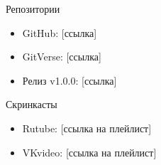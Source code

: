 \documentclass[
  ignorenonframetext,
  aspectratio=169,
  russian,
]{beamer}
\providecommand{\tightlist}{%
  \setlength{\itemsep}{0pt}\setlength{\parskip}{0pt}}\usepackage{longtable,booktabs,array}
\begin{document}
\begin{frame}{Репозитории}
\label{ux440ux435ux43fux43eux437ux438ux442ux43eux440ux438ux438}
\begin{itemize}[<+->]
\tightlist
\item
  GitHub: {[}ссылка{]}
\item
  GitVerse: {[}ссылка{]}
\item
  Релиз v1.0.0: {[}ссылка{]}
\end{itemize}
\end{frame}

\begin{frame}{Скринкасты}
\label{ux441ux43aux440ux438ux43dux43aux430ux441ux442ux44b}
\begin{itemize}[<+->]
\tightlist
\item
  Rutube: {[}ссылка на плейлист{]}
\item
  VKvideo: {[}ссылка на плейлист{]}
\end{itemize}
\end{frame}
\end{document}
